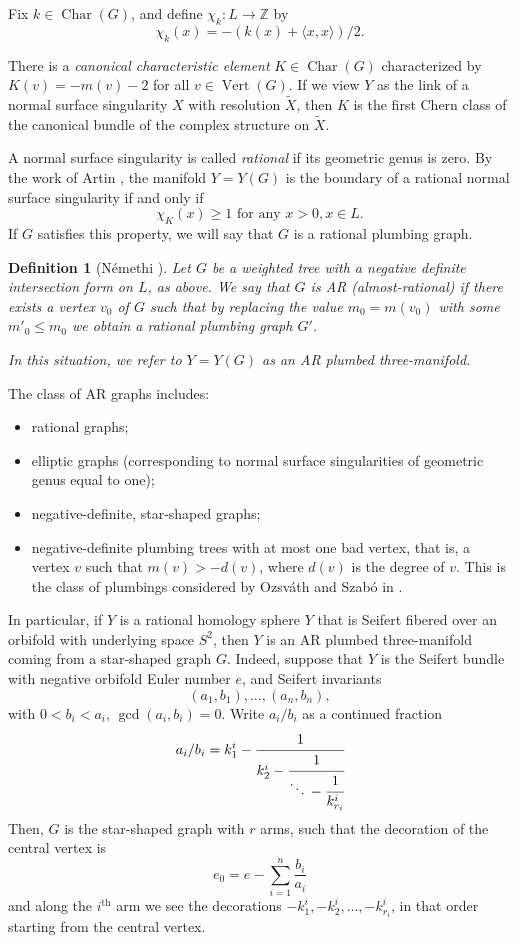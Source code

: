 \documentclass[11 pt]{amsart}
\newtheorem {definition}[theorem]{Definition}
\theoremstyle{remark}
\newcommand\Z{\mathbb{Z}}
\def\Vert{\operatorname{Vert}}
\def\Char{\operatorname{Char}}
\begin{document}
Fix $k \in \Char(G)$, and define $\chi_k: L \to \Z$ by
\begin{equation}
\label{eq:chik}
 \chi_k(x) = - (k(x) + \langle x, x \rangle)/2.
 \end{equation}

There is a {\em canonical characteristic element} $K \in \Char(G)$ characterized by $K(v) = -m(v)-2$ for all $v \in \Vert(G)$. If we view $Y$ as the link of a normal surface singularity $X$ with resolution $\tilde X$, then $K$ is the first Chern class of the canonical bundle of the complex structure on $\tilde X$. 

A normal surface singularity is called {\em rational} if its geometric genus is zero. By the work of Artin \cite{Artin1, Artin2}, the manifold $Y = Y(G)$ is the boundary of a rational normal surface singularity if and only if
$$ \chi_K(x) \geq 1 \text{ for any } x > 0, x \in L.$$
If $G$ satisfies this property, we will say that $G$ is a rational plumbing graph.

\begin{definition}[N{\'e}methi \cite{NemethiOS}]
Let $G$ be a weighted tree with a negative definite intersection form on $L$, as above. We say that $G$ is {\em AR (almost-rational)} if there exists a vertex $v_0$ of $G$ such that by replacing the value $m_0 = m(v_0)$ with some $m'_0 \leq m_0$ we obtain a rational plumbing graph $G'$.

In this situation, we refer to $Y=Y(G)$ as an {\em AR plumbed three-manifold}.
\end{definition}

The class of AR graphs includes:
\begin{itemize}
\item rational graphs;
\item elliptic graphs (corresponding to normal surface singularities of geometric genus equal to one);
\item negative-definite, star-shaped graphs;
\item negative-definite plumbing trees with at most one bad vertex, that is, a vertex $v$ such that $m(v) > -d(v)$, where $d(v)$ is the degree of $v$. This is the class of plumbings considered by Ozsv\'ath and Szab\'o in \cite{Plumbed}.
\end{itemize}

In particular, if $Y$ is a rational homology sphere $Y$ that is Seifert fibered over an orbifold with underlying space $S^2$, then $Y$ is an AR plumbed three-manifold coming from a star-shaped graph $G$. Indeed, suppose that $Y$ is the Seifert bundle with negative orbifold Euler number $e$, and Seifert invariants
$$ (a_1, b_1), \dots, (a_n, b_n),$$
with $0 < b_i < a_i$, $\gcd(a_i, b_i) = 0$. Write $a_i/b_i$ as a continued fraction
$$a_i/b_i = k_1^i - \cfrac{1}{ k_2^i - \cfrac{1} {\ddots \, - \cfrac{1}{ k_{r_i}^i}}}$$ Then, $G$ is the star-shaped graph with $r$ arms, such that the decoration of the central vertex is
$$ e_0=e- \sum_{i=1}^n \frac{b_i}{a_i}$$
and along the $i^{\operatorname{th}}$ arm we see the decorations $-k_1^i, -k_2^i, \dots, -k_{r_i}^i$, in that order starting from the central vertex.
\end{document}
